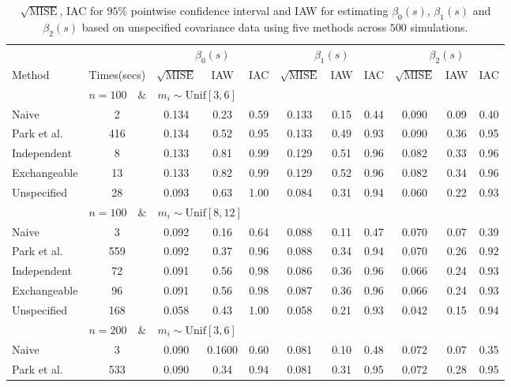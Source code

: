 \documentclass[submit]{smj}
\begin{document}
\begin{table}
	\centering
	\caption{$\sqrt{\text{MISE}}$, IAC for $95\%$ pointwise confidence interval and IAW for estimating $\beta_0(s)$, $\beta_1(s)$ and $\beta_2(s)$ based on  unspecified covariance data using five methods across $500$ simulations. }
	\label{tab:linear6}
	\begin{adjustbox}{width=\textwidth}
	\begin{tabular}{l|cccccccccc}
		\hline
		& & \multicolumn{3}{c}{$\beta_0(s)$} & \multicolumn{3}{c}{$\beta_1(s)$} &  \multicolumn{3}{c}{$\beta_2(s)$}    \\
		Method & Times(secs)&$\sqrt{\text{MISE}}$ & IAW & IAC & $\sqrt{\text{MISE}}$& IAW & IAC & $\sqrt{\text{MISE}}$ & IAW & IAC     \\
		\hline
		& \multicolumn{10}{l}{$n=100 \quad\& \quad m_i \sim  \text{Unif}[3,6]$}\\		
		Naive& 2& 0.134 & 0.23 & 0.59 & 0.133 & 0.15 & 0.44 & 0.090 & 0.09 & 0.40 \\ 
		Park et al.& 416& 0.134 & 0.52 & 0.95 & 0.133 & 0.49 & 0.93 & 0.090 & 0.36 & 0.95 \\ 
		Independent & 8& 0.133 & 0.81 & 0.99 & 0.129 & 0.51 & 0.96 & 0.082 & 0.33 & 0.96 \\ 
		Exchangeable & 13& 0.133 & 0.82 & 0.99 & 0.129 & 0.52 & 0.96 & 0.082 & 0.34 & 0.96 \\  
		Unspecified & 28& 0.093 & 0.63 & 1.00 & 0.084 & 0.31 & 0.94 & 0.060 & 0.22 & 0.93 \\
		& \multicolumn{10}{l}{$n=100 \quad\& \quad m_i \sim \text{Unif}[8,12]$}\\
		Naive& 3& 0.092 & 0.16 & 0.64 & 0.088 & 0.11 & 0.47 & 0.070 & 0.07 & 0.39 \\ 
		Park et al.&559& 0.092 & 0.37 & 0.96 & 0.088 & 0.34 & 0.94 & 0.070 & 0.26 & 0.92 \\ 
		Independent & 72&  0.091 & 0.56 & 0.98 & 0.086 & 0.36 & 0.96 & 0.066 & 0.24 & 0.93 \\ 
		Exchangeable &96& 0.091 & 0.56 & 0.98 & 0.087 & 0.36 & 0.96 & 0.066 & 0.24 & 0.93 \\
		Unspecified & 168& 0.058 & 0.43 & 1.00 & 0.058 & 0.21 & 0.93 & 0.042 & 0.15 & 0.94 \\ 
		& \multicolumn{10}{l}{$n=200 \quad\& \quad m_i \sim  \text{Unif}[3,6]$}\\
		Naive& 3& 0.090 & 0.1600 & 0.60 & 0.081 & 0.10 & 0.48 & 0.072 & 0.07 & 0.35 \\ 
		Park et al.& 533& 0.090 & 0.34 & 0.94 & 0.081 & 0.31 & 0.95 & 0.072 & 0.28 & 0.95 \\ 

\end{tabular}
\end{adjustbox}
\end{table}
\end{document}
